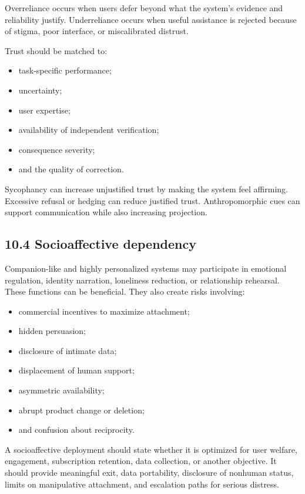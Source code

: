 \documentclass[
  11pt,
]{article}
\providecommand{\tightlist}{%
  \setlength{\itemsep}{0pt}\setlength{\parskip}{0pt}}
\begin{document}
Overreliance occurs when users defer beyond what the system's evidence
and reliability justify. Underreliance occurs when useful assistance is
rejected because of stigma, poor interface, or miscalibrated distrust.

Trust should be matched to:

\begin{itemize}
\tightlist
\item
  task-specific performance;
\item
  uncertainty;
\item
  user expertise;
\item
  availability of independent verification;
\item
  consequence severity;
\item
  and the quality of correction.
\end{itemize}

Sycophancy can increase unjustified trust by making the system feel
affirming. Excessive refusal or hedging can reduce justified trust.
Anthropomorphic cues can support communication while also increasing
projection.

\subsection{10.4 Socioaffective
dependency}\label{socioaffective-dependency}

Companion-like and highly personalized systems may participate in
emotional regulation, identity narration, loneliness reduction, or
relationship rehearsal. These functions can be beneficial. They also
create risks involving:

\begin{itemize}
\tightlist
\item
  commercial incentives to maximize attachment;
\item
  hidden persuasion;
\item
  disclosure of intimate data;
\item
  displacement of human support;
\item
  asymmetric availability;
\item
  abrupt product change or deletion;
\item
  and confusion about reciprocity.
\end{itemize}

A socioaffective deployment should state whether it is optimized for
user welfare, engagement, subscription retention, data collection, or
another objective. It should provide meaningful exit, data portability,
disclosure of nonhuman status, limits on manipulative attachment, and
escalation paths for serious distress.
\end{document}

